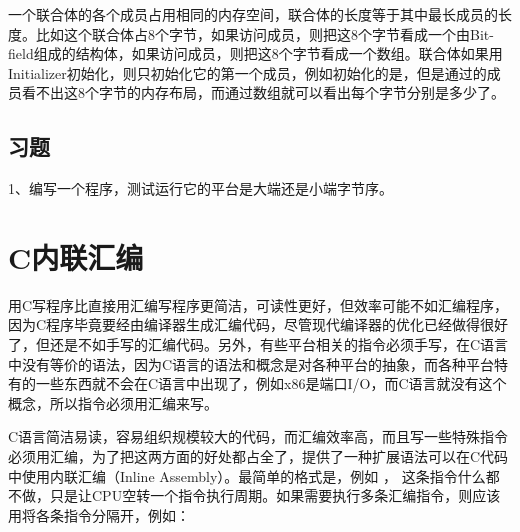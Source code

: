 一个联合体的各个成员占用相同的内存空间，联合体的长度等于其中最长成员的长度。比如这个联合体占8个字节，如果访问成员，则把这8个字节看成一个由Bit-field组成的结构体，如果访问成员，则把这8个字节看成一个数组。联合体如果用Initializer初始化，则只初始化它的第一个成员，例如初始化的是，但是通过的成员看不出这8个字节的内存布局，而通过数组就可以看出每个字节分别是多少了。


\subsection*{习题}
%


1、编写一个程序，测试运行它的平台是大端还是小端字节序。




\section{C内联汇编}
%
用C写程序比直接用汇编写程序更简洁，可读性更好，但效率可能不如汇编程序，因为C程序毕竟要经由编译器生成汇编代码，尽管现代编译器的优化已经做得很好了，但还是不如手写的汇编代码。另外，有些平台相关的指令必须手写，在C语言中没有等价的语法，因为C语言的语法和概念是对各种平台的抽象，而各种平台特有的一些东西就不会在C语言中出现了，例如x86是端口I/\BookSplit{}O，而C语言就没有这个概念，所以指令必须用汇编来写。



C语言简洁易读，容易组织规模较大的代码，而汇编效率高，而且写一些特殊指令必须用汇编，为了把这两方面的好处都占全了，提供了一种扩展语法可以在C代码中使用内联汇编（Inline Assembly）。最简单的格式是，例如 ， 这条指令什么都不做，只是让CPU空转一个指令执行周期。如果需要执行多条汇编指令，则应该用将各条指令分隔开，例如：


